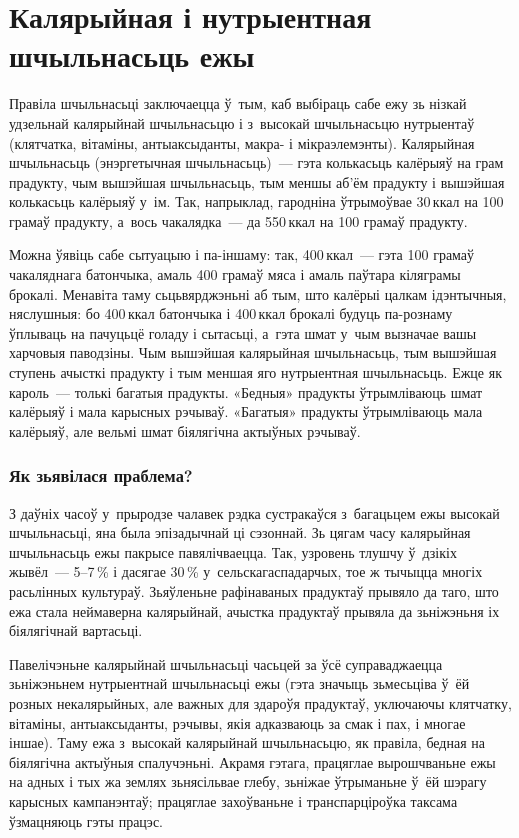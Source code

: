 
\chapter[Калярыйная і нутрыентная шчыльнасьць ежы][Шчыльнасьць ежы]{Калярыйная і нутрыентная шчыльнасьць ежы}

Правіла шчыльнасьці заключаецца ў~тым, каб выбіраць сабе ежу зь нізкай удзельнай калярыйнай шчыльнасьцю і з~высокай шчыльнасьцю нутрыентаў (клятчатка, вітаміны, антыаксыданты, макра- і мікраэлемэнты). Калярыйная шчыльнасьць (энэргетычная шчыльнасьць)~--- гэта колькасьць калёрыяў на грам прадукту, чым вышэйшая шчыльнасьць, тым меншы аб'ём прадукту і вышэйшая колькасьць калёрыяў у~ім. Так, напрыклад, гародніна ўтрымоўвае 30\,ккал на 100 грамаў прадукту, а~вось чакалядка~--- да 550\,ккал на 100 грамаў прадукту.

Можна ўявіць сабе сытуацыю і па-іншаму: так, 400\,ккал~--- гэта 100 грамаў чакаляднага батончыка, амаль 400 грамаў мяса і амаль паўтара кіляграмы брокалі. Менавіта таму сьцьвярджэньні аб тым, што калёрыі цалкам ідэнтычныя, няслушныя: бо 400\,ккал батончыка і 400\,ккал брокалі будуць па-рознаму ўплываць на пачуцьцё голаду і сытасьці, а~гэта шмат у~чым вызначае вашы харчовыя паводзіны. Чым вышэйшая калярыйная шчыльнасьць, тым вышэйшая ступень ачысткі прадукту і тым меншая яго нутрыентная шчыльнасьць. Ежце як кароль~--- толькі багатыя прадукты. «Бедныя» прадукты ўтрымліваюць шмат калёрыяў і мала карысных рэчываў. «Багатыя» прадукты ўтрымліваюць мала калёрыяў, але вельмі шмат біялягічна актыўных рэчываў.

\subsection{Як зьявілася праблема?}

З даўніх часоў у~прыродзе чалавек рэдка сустракаўся з~багацьцем ежы высокай шчыльнасьці, яна была эпізадычнай ці сэзоннай. Зь цягам часу калярыйная шчыльнасьць ежы пакрысе павялічваецца. Так, узровень тлушчу ў~дзікіх жывёл~--- 5--7\,\% і дасягае 30\,\% у~сельскагаспадарчых, тое ж тычыцца многіх расьлінных культураў. Зьяўленьне рафінаваных прадуктаў прывяло да таго, што ежа стала неймаверна калярыйнай, ачыстка прадуктаў прывяла да зьніжэньня іх біялягічнай вартасьці.

Павелічэньне калярыйнай шчыльнасьці часьцей за ўсё суправаджаецца зьніжэньнем нутрыентнай шчыльнасьці ежы (гэта значыць зьмесьціва ў~ёй розных некалярыйных, але важных для здароўя прадуктаў, уключаючы клятчатку, вітаміны, антыаксыданты, рэчывы, якія адказваюць за смак і пах, і многае іншае). Таму ежа з~высокай калярыйнай шчыльнасьцю, як правіла, бедная на біялягічна актыўныя спалучэньні. Акрамя гэтага, працяглае вырошчваньне ежы на адных і тых жа землях зьнясільвае глебу, зьніжае ўтрыманьне ў~ёй шэрагу карысных кампанэнтаў; працяглае захоўваньне і транспарціроўка таксама ўзмацняюць гэты працэс.

